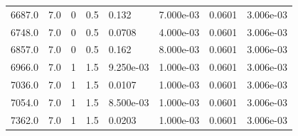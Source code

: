\documentclass[preview]{standalone}
\begin{document}
{{{{\begin{tabular}{L{1.2cm}C{1.2cm} C{0.3cm}C{0.5cm} C{1.4cm}C{1.4cm} C{1.4cm}C{1.4cm}}
  6687.0  &   7.0  & 0     & 0.5 &  0.132  & 7.000e-03  & 0.0601 &  3.006e-03   \\ 
  6748.0  &   7.0  & 0     & 0.5 &  0.0708  & 4.000e-03  & 0.0601 &  3.006e-03   \\ 
  6857.0  &   7.0  & 0     & 0.5 &  0.162  & 8.000e-03  & 0.0601 &  3.006e-03   \\ 
  6966.0  &   7.0  & 1     & 1.5 &  9.250e-03  & 1.000e-03  & 0.0601 &  3.006e-03   \\ 
  7036.0  &   7.0  & 1     & 1.5 &  0.0107  & 1.000e-03  & 0.0601 &  3.006e-03   \\ 
  7054.0  &   7.0  & 1     & 1.5 &  8.500e-03  & 1.000e-03  & 0.0601 &  3.006e-03   \\ 
  7362.0  &   7.0  & 1     & 1.5 &  0.0203  & 1.000e-03  & 0.0601 &  3.006e-03   \\ 
\hline 
\end{tabular} 

}}}}
\end{document}
